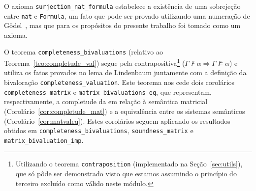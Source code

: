         O axioma \texttt{surjection\_nat\_formula} estabelece a existência de uma sobrejeção entre \texttt{nat} e \texttt{Formula}, um fato que pode ser provado utilizando uma numeração de G{\"o}del~\cite{sep-goedel-incompleteness}, mas que para os propósitos do presente trabalho foi tomado como um axioma.

        O teorema \texttt{completeness\_bivaluations} (relativo ao Teorema~\ref{teo:completude_val}) segue pela contrapositiva\footnote{Utilizando o teorema \texttt{contraposition} (implementado na Seção~\ref{sec:utils}), que só pôde ser demonstrado visto que estamos assumindo o princípio do terceiro excluído como válido neste módulo.} ($\Gamma \nvdash \alpha \Longrightarrow \Gamma \nvDash \alpha$) e utiliza os fatos provados no lema de Lindenbaum juntamente com a definição da bivaloração \texttt{completeness\_valuation}. Este teorema nos cede dois corolários \texttt{completeness\_matrix} e \texttt{matrix\_bivaluations\_eq}, que representam, respectivamente, a completude da \lfium{} em relação à semântica matricial (Corolário~\ref{cor:completude_mat}) e a equivalência entre os sistemas semânticos (Corolário~\ref{cor:matvaleq}). Estes corolários seguem aplicando os resultados obtidos em \texttt{completeness\_bivaluations}, \texttt{soundness\_matrix} e \texttt{matrix\_bivaluation\_imp}.